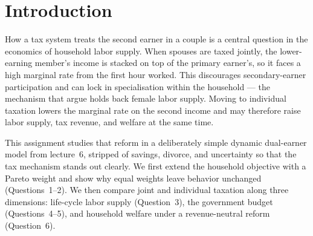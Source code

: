 \section{Introduction}

How a tax system treats the second earner in a couple is a central question in the economics of household labor supply. When spouses are taxed jointly, the lower-earning member's income is stacked on top of the primary earner's, so it faces a high marginal rate from the first hour worked. This discourages secondary-earner participation and can lock in specialisation within the household --- the mechanism that \cite{borella2023} argue holds back female labor supply. Moving to individual taxation lowers the marginal rate on the second income and may therefore raise labor supply, tax revenue, and welfare at the same time.

This assignment studies that reform in a deliberately simple dynamic dual-earner model from lecture~6, stripped of savings, divorce, and uncertainty so that the tax mechanism stands out clearly. We first extend the household objective with a Pareto weight and show why equal weights leave behavior unchanged (Questions~1--2). We then compare joint and individual taxation along three dimensions: life-cycle labor supply (Question~3), the government budget (Questions~4--5), and household welfare under a revenue-neutral reform (Question~6).

